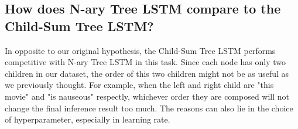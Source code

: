     \subsection{How does N-ary Tree LSTM compare to the Child-Sum Tree LSTM?}
    In opposite to our original hypothesis, the Child-Sum Tree LSTM performs
    competitive with N-ary Tree LSTM in this task. Since each node has only two
    children in our dataset, the order of this two children might not be as
    useful as we previously thought. For example, when the left and right child
    are "this movie" and "is nauseous" respectly, whichever order they are
    composed will not change the final inference result too much. The reasons
    can also lie in the choice of hyperparameter, especially in learning rate. 
